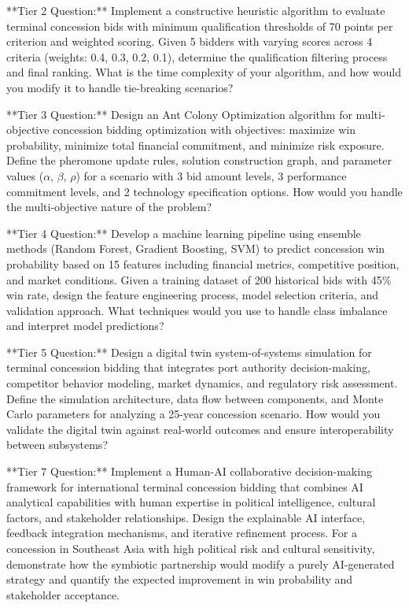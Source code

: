 \documentclass{article}
\begin{document}
**Tier 2 Question:** Implement a constructive heuristic algorithm to evaluate terminal concession bids with minimum qualification thresholds of 70 points per criterion and weighted scoring. Given 5 bidders with varying scores across 4 criteria (weights: 0.4, 0.3, 0.2, 0.1), determine the qualification filtering process and final ranking. What is the time complexity of your algorithm, and how would you modify it to handle tie-breaking scenarios?

**Tier 3 Question:** Design an Ant Colony Optimization algorithm for multi-objective concession bidding optimization with objectives: maximize win probability, minimize total financial commitment, and minimize risk exposure. Define the pheromone update rules, solution construction graph, and parameter values ($\alpha$, $\beta$, $\rho$) for a scenario with 3 bid amount levels, 3 performance commitment levels, and 2 technology specification options. How would you handle the multi-objective nature of the problem?

**Tier 4 Question:** Develop a machine learning pipeline using ensemble methods (Random Forest, Gradient Boosting, SVM) to predict concession win probability based on 15 features including financial metrics, competitive position, and market conditions. Given a training dataset of 200 historical bids with 45\% win rate, design the feature engineering process, model selection criteria, and validation approach. What techniques would you use to handle class imbalance and interpret model predictions?

**Tier 5 Question:** Design a digital twin system-of-systems simulation for terminal concession bidding that integrates port authority decision-making, competitor behavior modeling, market dynamics, and regulatory risk assessment. Define the simulation architecture, data flow between components, and Monte Carlo parameters for analyzing a 25-year concession scenario. How would you validate the digital twin against real-world outcomes and ensure interoperability between subsystems?

**Tier 7 Question:** Implement a Human-AI collaborative decision-making framework for international terminal concession bidding that combines AI analytical capabilities with human expertise in political intelligence, cultural factors, and stakeholder relationships. Design the explainable AI interface, feedback integration mechanisms, and iterative refinement process. For a concession in Southeast Asia with high political risk and cultural sensitivity, demonstrate how the symbiotic partnership would modify a purely AI-generated strategy and quantify the expected improvement in win probability and stakeholder acceptance.
\end{document}
